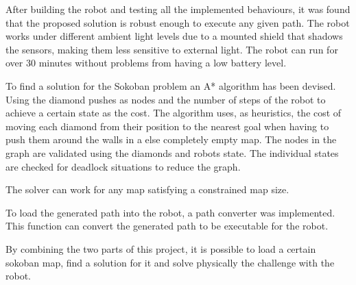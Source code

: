 
After building the robot and testing all the implemented behaviours, it was found that the proposed solution is robust enough to execute any given path.
The robot works under different ambient light levels due to a mounted shield that shadows the sensors, making them less sensitive to external light.
The robot can run for over 30 minutes without problems from having a low battery level.

To find a solution for the Sokoban problem an A* algorithm has been devised.
Using the diamond pushes as nodes and the number of steps of the robot to achieve a certain state as the cost.
The algorithm uses, as heuristics, the cost of moving each diamond from their position to the nearest goal when having to push them around the walls in a else completely empty map.
The nodes in the graph are validated using the diamonds and robots state.
The individual states are checked for deadlock situations to reduce the graph.

The solver can work for any map satisfying a constrained map size.

To load the generated path into the robot, a path converter was implemented.
This function can convert the generated path to be executable for the robot.

By combining the two parts of this project, it is possible to load a certain sokoban map, find a solution for it and solve physically the challenge with the robot.
